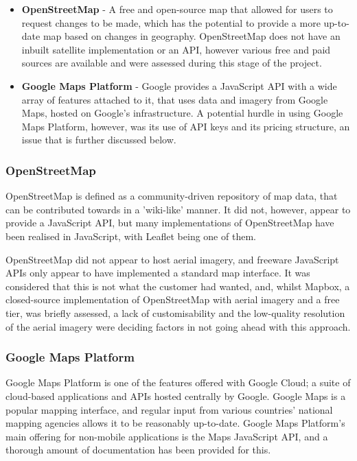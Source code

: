 \begin{itemize}
\item	\textbf{OpenStreetMap} - A free and open-source map that allowed for users to request changes to be made, which has the potential to provide a more up-to-date map based on changes in geography. OpenStreetMap does not have an inbuilt satellite implementation or an API, however various free and paid sources are available and were assessed during this stage of the project.
\item	\textbf{Google Maps Platform} - Google provides a JavaScript API with a wide array of features attached to it, that uses data and imagery from Google Maps, hosted on Google's infrastructure. A potential hurdle in using Google Maps Platform, however, was its use of API keys and its pricing structure, an issue that is further discussed below.
\end{itemize}

\subsubsection{OpenStreetMap}

OpenStreetMap is defined as a community-driven repository of map data, that can be contributed towards in a 'wiki-like' manner\cite{OpenStreetMap}. It did not, however, appear to provide a JavaScript API, but many implementations of OpenStreetMap have been realised in JavaScript, with Leaflet being one of them\cite{Leaflet}.

OpenStreetMap did not appear to host aerial imagery, and freeware JavaScript APIs only appear to have implemented a standard map interface. It was considered that this is not what the customer had wanted, and, whilst Mapbox, a closed-source implementation of OpenStreetMap with aerial imagery and a free tier, was briefly assessed, a lack of customisability and the low-quality resolution of the aerial imagery were deciding factors in not going ahead with this approach\cite{Mapbox}.

\subsubsection{Google Maps Platform}

Google Maps Platform is one of the features offered with Google Cloud; a suite of cloud-based applications and APIs hosted centrally by Google. Google Maps is a popular mapping interface, and regular input from various countries' national mapping agencies allows it to be reasonably up-to-date. Google Maps Platform's main offering for non-mobile applications is the Maps JavaScript API, and a thorough amount of documentation has been provided for this\cite{GoogleMaps}.

